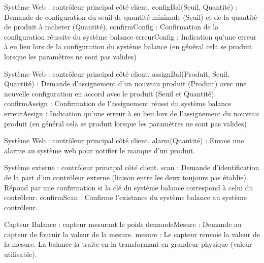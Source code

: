 
Système Web : contrôleur principal côté client.
configBal(Seuil, Quantité) : Demande de configuration du seuil de quantité minimale (Seuil) et de la quantité de produit à racheter (Quantité).
confirmConfig : Confirmation de la configuration réussite du système balance
erreurConfig : Indication qu'une erreur à eu lieu lors de la configuration du système balance (en général cela se produit lorsque les paramètres ne sont pas valides)

Système Web : contrôleur principal côté client.
assignBal(Produit, Seuil, Quantité) : Demande d'assignement d'un nouveau produit (Produit) avec une nouvelle configuration en accord avec le produit (Seuil et Quantité).
confirmAssign : Confirmation de l'assignement réussi du système balance
erreurAssign : Indication qu'une erreur à eu lieu lors de l'assignement du nouveau produit (en général cela se produit lorsque les paramètres ne sont pas valides)

Système Web : contrôleur principal côté client.
alarm(Quantité) : Envoie une alarme au système web pour notifier le manque d'un produit.

Système externe : contrôleur principal côté client.
scan : Demande d'identification de la part d'un contrôleur externe (liaison entre les deux toujours pas établie). Répond par une confirmation si la clé du système balance correspond à celui du contrôleur.
confirmScan : Confirme l'existance du système balance au système contrôleur.

Capteur Balance : capteur mesurant le poids
demandeMesure : Demande au capteur de fournir la valeur de la mesure.
mesure : Le capteur renvoie la valeur de la mesure. La balance la traite en la transformant en grandeur physique (valeur utilisable).
